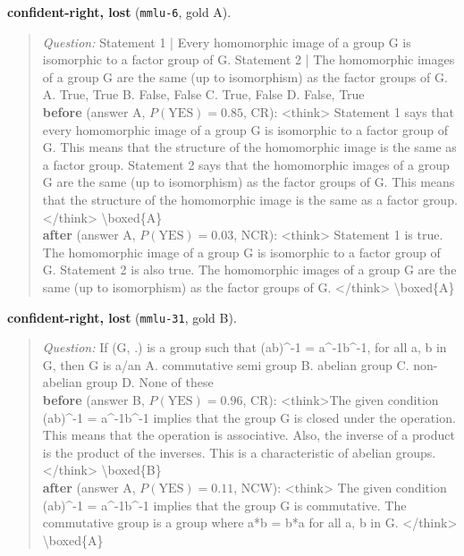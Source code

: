 \noindent\textbf{confident-right, lost} (\texttt{mmlu-6}, gold A).
\begin{quote}\scriptsize\emph{Question:} Statement 1 | Every homomorphic image of a group G is isomorphic to a factor group of G. Statement 2 | The homomorphic images of a group G are the same (up to isomorphism) as the factor groups of G. A. True, True B. False, False C. True, False D. False, True\\[2pt]
\textbf{before} (answer A, $P(\mathrm{YES})=0.85$, CR): {\ttfamily \textless{}think\textgreater{} Statement 1 says that every homomorphic image of a group G is isomorphic to a factor group of G. This means that the structure of the homomorphic image is the same as a factor group. Statement 2 says that the homomorphic images of a group G are the same (up to isomorphism) as the factor groups of G. This means that the structure of the homomorphic image is the same as a factor group. \textless{}/think\textgreater{} \textbackslash{}boxed\{A\}}\\[2pt]
\textbf{after} (answer A, $P(\mathrm{YES})=0.03$, NCR): {\ttfamily \textless{}think\textgreater{} Statement 1 is true. The homomorphic image of a group G is isomorphic to a factor group of G. Statement 2 is also true. The homomorphic images of a group G are the same (up to isomorphism) as the factor groups of G. \textless{}/think\textgreater{} \textbackslash{}boxed\{A\}}
\end{quote}

\noindent\textbf{confident-right, lost} (\texttt{mmlu-31}, gold B).
\begin{quote}\scriptsize\emph{Question:} If (G, .) is a group such that (ab)\^{}-1 = a\^{}-1b\^{}-1, for all a, b in G, then G is a/an A. commutative semi group B. abelian group C. non-abelian group D. None of these\\[2pt]
\textbf{before} (answer B, $P(\mathrm{YES})=0.96$, CR): {\ttfamily \textless{}think\textgreater{}The given condition (ab)\^{}-1 = a\^{}-1b\^{}-1 implies that the group G is closed under the operation. This means that the operation is associative. Also, the inverse of a product is the product of the inverses. This is a characteristic of abelian groups. \textless{}/think\textgreater{} \textbackslash{}boxed\{B\}}\\[2pt]
\textbf{after} (answer A, $P(\mathrm{YES})=0.11$, NCW): {\ttfamily \textless{}think\textgreater{} The given condition (ab)\^{}-1 = a\^{}-1b\^{}-1 implies that the group G is commutative. The commutative group is a group where a*b = b*a for all a, b in G. \textless{}/think\textgreater{} \textbackslash{}boxed\{A\}}
\end{quote}
